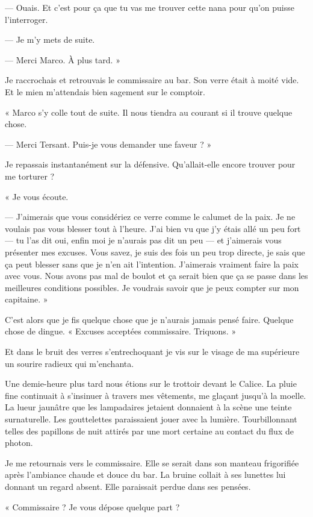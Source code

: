 — Ouais. Et c'est pour ça que tu vas me trouver cette nana pour qu'on puisse l'interroger.

— Je m'y mets de suite. 

— Merci Marco. À plus tard. »

Je raccrochais et retrouvais le commissaire au bar. Son verre était à moité vide. Et le mien m'attendais bien sagement 
sur le comptoir.

« Marco s'y colle tout de suite. Il nous tiendra au courant si il trouve quelque chose.

— Merci Tersant. Puis-je vous demander une faveur ? »

Je repassais instantanément sur la défensive. Qu'allait-elle encore trouver pour me torturer ?

« Je vous écoute.

— J'aimerais que vous considériez ce verre comme le calumet de la paix. Je ne voulais pas vous blesser tout à l'heure. 
J'ai bien vu que j'y étais allé un peu fort — tu l'as dit oui, enfin moi je n'aurais pas dit un peu — et j'aimerais 
vous présenter mes excuses. Vous savez, je suis des fois un peu trop directe, je sais que ça peut blesser sans que je 
n'en ait l'intention. J'aimerais vraiment faire la paix avec vous. Nous avons pas mal de boulot et ça serait bien 
que ça se passe dans les meilleures conditions possibles. Je voudrais savoir que je peux compter sur mon capitaine. »

C'est alors que je fis quelque chose que je n'aurais jamais pensé faire. Quelque chose de dingue. « Excuses acceptées 
commissaire. Triquons. »

Et dans le bruit des verres s'entrechoquant je vis sur le visage de ma supérieure un sourire radieux qui m'enchanta.

Une demie-heure plus tard nous étions sur le trottoir devant le Calice. La pluie fine continuait à s'insinuer à travers 
mes vêtements, me glaçant jusqu'à la moelle. La lueur jaunâtre que les lampadaires jetaient donnaient à la scène une 
teinte surnaturelle. Les gouttelettes paraissaient jouer avec la lumière. Tourbillonnant telles des papillons de nuit 
attirés par une mort certaine au contact du flux de photon.

Je me retournais vers le commissaire. Elle se serait dans son manteau frigorifiée après l'ambiance chaude et douce du
bar. La bruine collait à ses lunettes lui donnant un regard absent. Elle paraissait perdue dans ses pensées.

« Commissaire ? Je vous dépose quelque part ?

